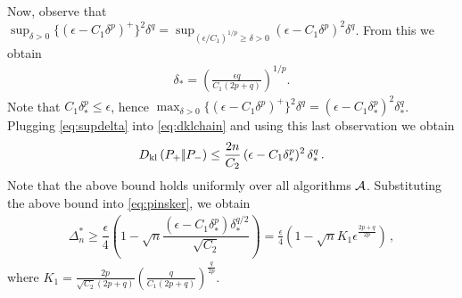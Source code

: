 Now, observe that 
$\sup_{\delta> 0} \{(\epsilon - C_1 \delta^p)^+\}^2 \delta^q = \sup_{(\epsilon/C_1)^{1/p} \ge \delta> 0} (\epsilon - C_1 \delta^p)^2 \delta^q$. From this we obtain
\begin{align}
\delta_*=\left(\frac{\epsilon q}{C_1(2p+q)}\right)^{1/p}. \label{eq:deltastar}
\end{align}
Note that $C_1\delta_*^p\le \epsilon$, hence
$\max_{\delta> 0} \{(\epsilon - C_1 \delta^p)^+\}^2 \delta^q =  (\epsilon-C_1 \delta_*^p)^2 \delta_*^q$.
Plugging \eqref{eq:supdelta} into \eqref{eq:dklchain} and using this last observation we obtain
\begin{align}
D_{\rm kl}\left({P_{+}} |\!| {P_{-}} \right) \le \dfrac{2n}{C_2} \,(\epsilon-C_1\delta_*^p)^2\, \delta_*^q\,.
\end{align}
Note that the above bound holds uniformly over all algorithms $\mathcal{A}$. 
Substituting the above bound into \eqref{eq:pinsker}, we obtain 
\begin{align}
\Delta_n^{*}
  \ge  \dfrac{\epsilon}{4} \left(1 - \sqrt{
    n}  \dfrac{ (\epsilon-C_1\delta_*^p)\delta_*^{q/2}}{\sqrt{C_2}}
  \right)
  = \frac{\epsilon}{4}\left(1-\sqrt{n} K_1 \epsilon^{\frac{2p+q}{2p}}\right)\,,\label{eq:final-lower-bd}
\end{align}
where $K_1= \frac{2p}{\sqrt{C_2}(2p+q)}\left(\frac{q}{C_1(2p+q)}\right)^{\frac{q}{2p}}$.
